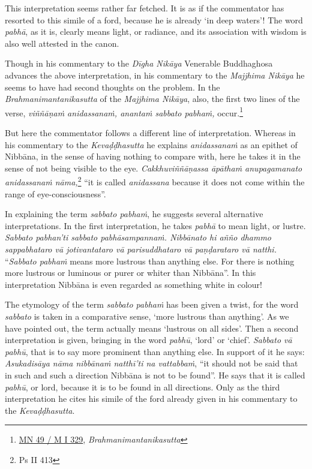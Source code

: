 This interpretation seems rather far fetched. It is as if the commentator has resorted to this simile of a ford, because he is already `in deep waters'! The word \emph{pabhā}, as it is, clearly means light, or radiance, and its association with wisdom is also well attested in the canon.

Though in his commentary to the \emph{Dīgha Nikāya} Venerable Buddhaghosa advances the above interpretation, in his commentary to the \emph{Majjhima Nikāya} he seems to have had second thoughts on the problem. In the \emph{Brahmanimantanikasutta} of the \emph{Majjhima Nikāya}, also, the first two lines of the verse, \emph{viññāṇaṁ anidassanaṁ, anantaṁ sabbato pabhaṁ,} occur.\footnote{\href{https://suttacentral.net/mn49/pli/ms}{MN 49 / M I 329}, \emph{Brahmanimantanikasutta}}

But here the commentator follows a different line of interpretation. Whereas in his commentary to the \emph{Kevaḍḍhasutta} he explains \emph{anidassanaṁ} as an epithet of Nibbāna, in the sense of having nothing to compare with, here he takes it in the sense of not being visible to the eye. \emph{Cakkhuviññāṇassa āpāthaṁ anupagamanato anidassanaṁ nāma,}\footnote{Ps II 413} ``it is called \emph{anidassana} because it does not come within the range of eye-consciousness''.

In explaining the term \emph{sabbato pabhaṁ}, he suggests several alternative interpretations. In the first interpretation, he takes \emph{pabhā} to mean light, or lustre. \emph{Sabbato pabhan'ti sabbato pabhāsampannaṁ. Nibbānato hi añño dhammo sappabhataro vā jotivantataro vā parisuddhataro vā paṇḍarataro vā natthi.} ``\emph{Sabbato pabhaṁ} means more lustrous than anything else. For there is nothing more lustrous or luminous or purer or whiter than Nibbāna''. In this interpretation Nibbāna is even regarded as something white in colour!

The etymology of the term \emph{sabbato pabhaṁ} has been given a twist, for the word \emph{sabbato} is taken in a comparative sense, `more lustrous than anything'. As we have pointed out, the term actually means `lustrous on all sides'. Then a second interpretation is given, bringing in the word \emph{pabhū}, `lord' or `chief'. \emph{Sabbato vā pabhū}, that is to say more prominent than anything else. In support of it he says: \emph{Asukadisāya nāma nibbānaṁ natthī'ti na vattabbaṁ}, ``it should not be said that in such and such a direction Nibbāna is not to be found''. He says that it is called \emph{pabhū}, or lord, because it is to be found in all directions. Only as the third interpretation he cites his simile of the ford already given in his commentary to the \emph{Kevaḍḍhasutta}.

